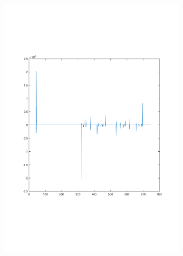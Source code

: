 \documentclass[sigconf]{acmart}
\begin{document}
\begin{figure}[tp]
\begin{subfigure}[t]{0.4\linewidth}
		\includegraphics[width=0.95\linewidth, trim={100 100 0 0}, clip=true]{fig/total_life_21}
		\label{fig:3.1c}
	\end{subfigure}
	\begin{subfigure}[t]{0.4\linewidth}
		\centering

\end{subfigure}
\end{figure}
\end{document}
